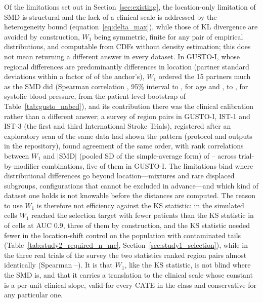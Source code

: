 \documentclass[AMA,Times1COL]{WileyNJDv5}
\begin{document}
Of the limitations set out in Section~\ref{sec:existing}, the location-only limitation of SMD is structural and the lack of a clinical scale is addressed by the heterogeneity bound (equation~\ref{eq:delta_max}), while those of KL divergence are avoided by construction, $W_1$ being symmetric, finite for any pair of empirical distributions, and computable from CDFs without density estimation; this does not mean returning a different answer in every dataset. In GUSTO-I, whose regional differences are predominantly differences in location (partner standard deviations within a factor of  of the anchor's), $W_1$ ordered the 15 partners much as the SMD did (Spearman correlation , 95\% interval  to , for age and ,  to , for systolic blood pressure, from the patient-level bootstrap of Table~\ref{tab:gusto_nabcd}), and its contribution there was the clinical calibration rather than a different answer; a survey of  region pairs in GUSTO-I, IST-1 and IST-3 (the first and third International Stroke Trials),\cite{gusto1993,ist1_2000,ist3_2012} registered after an exploratory scan of the same data had shown the pattern (protocol and outputs in the repository), found agreement of the same order, with rank correlations between $W_1$ and $|\mathrm{SMD}|$ (pooled SD of the simple-average form) of -- across  trial-by-modifier combinations, five of them in GUSTO-I. The limitations bind where distributional differences go beyond location---mixtures and rare displaced subgroups, configurations that cannot be excluded in advance---and which kind of dataset one holds is not knowable before the distances are computed. The reason to use $W_1$ is therefore not efficiency against the KS statistic: in the simulated cells $W_1$ reached the selection target with fewer patients than the KS statistic in  of  cells at AUC 0.9, three of them by construction, and the KS statistic needed fewer in the location-shift control on the population with contaminated tails (Table~\ref{tab:study2_required_n_mc}, Section~\ref{sec:study1_selection}), while in the three real trials of the survey the two statistics ranked region pairs almost identically (Spearman --). It is that $W_1$, like the KS statistic, is not blind where the SMD is, and that it carries a translation to the clinical scale whose constant is a per-unit clinical slope, valid for every CATE in the class and conservative for any particular one.
\end{document}
